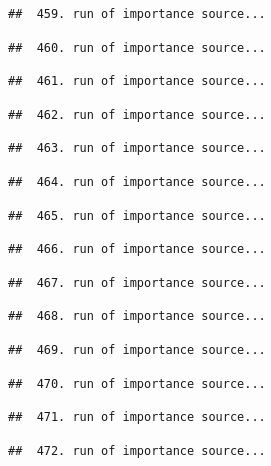 \documentclass[
]{article}
\begin{document}
\begin{verbatim}
##  459. run of importance source...
\end{verbatim}

\begin{verbatim}
##  460. run of importance source...
\end{verbatim}

\begin{verbatim}
##  461. run of importance source...
\end{verbatim}

\begin{verbatim}
##  462. run of importance source...
\end{verbatim}

\begin{verbatim}
##  463. run of importance source...
\end{verbatim}

\begin{verbatim}
##  464. run of importance source...
\end{verbatim}

\begin{verbatim}
##  465. run of importance source...
\end{verbatim}

\begin{verbatim}
##  466. run of importance source...
\end{verbatim}

\begin{verbatim}
##  467. run of importance source...
\end{verbatim}

\begin{verbatim}
##  468. run of importance source...
\end{verbatim}

\begin{verbatim}
##  469. run of importance source...
\end{verbatim}

\begin{verbatim}
##  470. run of importance source...
\end{verbatim}

\begin{verbatim}
##  471. run of importance source...
\end{verbatim}

\begin{verbatim}
##  472. run of importance source...
\end{verbatim}
\end{document}
